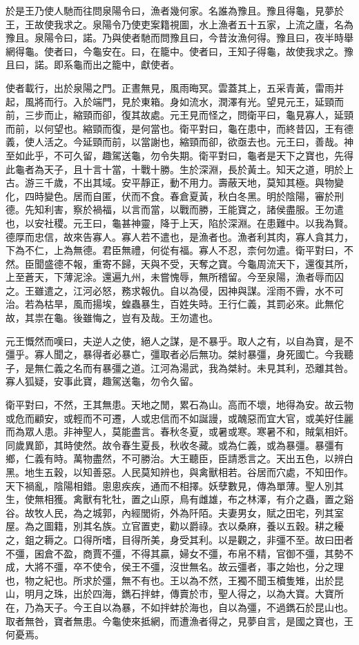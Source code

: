 於是王乃使人馳而往問泉陽令曰，漁者幾何家。名誰為豫且。豫且得龜，見夢於王，王故使我求之。泉陽令乃使吏案籍視圖，水上漁者五十五家，上流之廬，名為豫且。泉陽令曰，諾。乃與使者馳而問豫且曰，今昔汝漁何得。豫且曰，夜半時舉網得龜。使者曰，今龜安在。曰，在籠中。使者曰，王知子得龜，故使我求之。豫且曰，諾。即系龜而出之籠中，獻使者。

使者載行，出於泉陽之門。正晝無見，風雨晦冥。雲蓋其上，五采青黃，雷雨并起，風將而行。入於端門，見於東箱。身如流水，潤澤有光。望見元王，延頸而前，三步而止，縮頸而卻，復其故處。元王見而怪之，問衛平曰，龜見寡人，延頸而前，以何望也。縮頸而復，是何當也。衛平對曰，龜在患中，而終昔囚，王有德義，使人活之。今延頸而前，以當謝也，縮頸而卻，欲亟去也。元王曰，善哉。神至如此乎，不可久留，趣駕送龜，勿令失期。衛平對曰，龜者是天下之寶也，先得此龜者為天子，且十言十當，十戰十勝。生於深淵，長於黃土。知天之道，明於上古。游三千歲，不出其域。安平靜正，動不用力。壽蔽天地，莫知其極。與物變化，四時變色。居而自匿，伏而不食。春倉夏黃，秋白冬黑。明於陰陽，審於刑德。先知利害，察於禍福，以言而當，以戰而勝，王能寶之，諸侯盡服。王勿遣也，以安社稷。元王曰，龜甚神靈，降于上天，陷於深淵。在患難中。以我為賢。德厚而忠信，故來告寡人。寡人若不遣也，是漁者也。漁者利其肉，寡人貪其力，下為不仁，上為無德。君臣無禮，何從有福。寡人不忍，柰何勿遣。衛平對曰，不然。臣聞盛德不報，重寄不歸，天與不受，天奪之寶。今龜周流天下，還復其所，上至蒼天，下薄泥涂。還遍九州，未嘗愧辱，無所稽留。今至泉陽，漁者辱而囚之。王雖遣之，江河必怒，務求報仇。自以為侵，因神與謀。淫雨不霽，水不可治。若為枯旱，風而揚埃，蝗蟲暴生，百姓失時。王行仁義，其罰必來。此無佗故，其祟在龜。後雖悔之，豈有及哉。王勿遣也。

元王慨然而嘆曰，夫逆人之使，絕人之謀，是不暴乎。取人之有，以自為寶，是不彊乎。寡人聞之，暴得者必暴亡，彊取者必后無功。桀紂暴彊，身死國亡。今我聽子，是無仁義之名而有暴彊之道。江河為湯武，我為桀紂。未見其利，恐離其咎。寡人狐疑，安事此寶，趣駕送龜，勿令久留。

衛平對曰，不然，王其無患。天地之閒，累石為山。高而不壞，地得為安。故云物或危而顧安，或輕而不可遷，人或忠信而不如誕謾，或醜惡而宜大官，或美好佳麗而為眾人患。非神聖人，莫能盡言。春秋冬夏，或暑或寒。寒暑不和，賊氣相奸。同歲異節，其時使然。故令春生夏長，秋收冬藏。或為仁義，或為暴彊。暴彊有鄉，仁義有時。萬物盡然，不可勝治。大王聽臣，臣請悉言之。天出五色，以辨白黑。地生五穀，以知善惡。人民莫知辨也，與禽獸相若。谷居而穴處，不知田作。天下禍亂，陰陽相錯。悤悤疾疾，通而不相擇。妖孽數見，傳為單薄。聖人別其生，使無相獲。禽獸有牝牡，置之山原，鳥有雌雄，布之林澤，有介之蟲，置之谿谷。故牧人民，為之城郭，內經閭術，外為阡陌。夫妻男女，賦之田宅，列其室屋。為之圖籍，別其名族。立官置吏，勸以爵祿。衣以桑麻，養以五穀。耕之耰之，鉏之耨之。口得所嗜，目得所美，身受其利。以是觀之，非彊不至。故曰田者不彊，囷倉不盈，商賈不彊，不得其贏，婦女不彊，布帛不精，官御不彊，其勢不成，大將不彊，卒不使令，侯王不彊，沒世無名。故云彊者，事之始也，分之理也，物之紀也。所求於彊，無不有也。王以為不然，王獨不聞玉櫝隻雉，出於昆山，明月之珠，出於四海，鐫石拌蚌，傳賣於市，聖人得之，以為大寶。大寶所在，乃為天子。今王自以為暴，不如拌蚌於海也，自以為彊，不過鐫石於昆山也。取者無咎，寶者無患。今龜使來抵網，而遭漁者得之，見夢自言，是國之寶也，王何憂焉。


